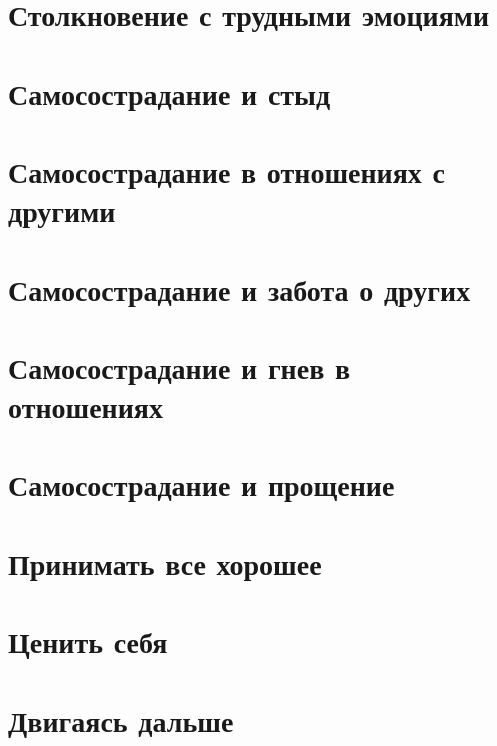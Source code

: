 \documentclass[a4paper,12pt]{report}
\begin{document}



\tableofcontents



















\chapter{Столкновение с трудными эмоциями}
\chapter{Самосострадание и стыд}
\chapter{Самосострадание в отношениях с другими} \label{Self-Compassion_in_Relationships}
\chapter{Самосострадание и забота о других} \label{Self-Compassion_for_Caregivers}
\chapter{Самосострадание и гнев в отношениях}
\chapter{Самосострадание и прощение}
\chapter{Принимать все хорошее}
\chapter{Ценить себя}
\chapter{Двигаясь дальше}



\end{document}
